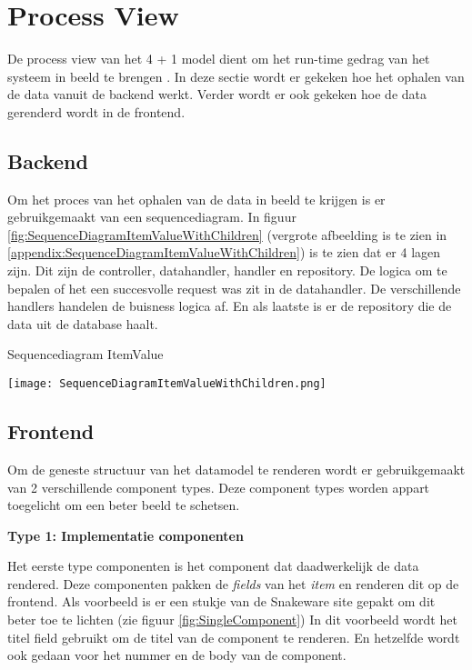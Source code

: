 \section{Process View}
De process view van het 4 + 1 model dient om het run-time gedrag van het systeem in beeld te brengen \parencite{4p1Model}.
In deze sectie wordt er gekeken hoe het ophalen van de data vanuit de backend werkt.
Verder wordt er ook gekeken hoe de data gerenderd wordt in de frontend.

\subsection{Backend}
Om het proces van het ophalen van de data in beeld te krijgen is er gebruikgemaakt van een sequencediagram.
In figuur \ref{fig:SequenceDiagramItemValueWithChildren} (vergrote afbeelding is te zien in \ref{appendix:SequenceDiagramItemValueWithChildren}) is te zien dat er 4 lagen zijn. 
Dit zijn de controller, datahandler, handler en repository.
De logica om te bepalen of het een succesvolle request was zit in de datahandler.
De verschillende handlers handelen de buisness logica af.
En als laatste is er de repository die de data uit de database haalt.

\whitespace
\begin{graphic}
    \captionsetup{type=figure}
    \caption{Sequencediagram ItemValue}
    \texttt{[image: SequenceDiagramItemValueWithChildren.png]}
    \label{fig:SequenceDiagramItemValueWithChildren}
\end{graphic}

\newpage
\subsection{Frontend}
\label{sec:FrontendProcessView}
Om de geneste structuur van het datamodel te renderen wordt er gebruikgemaakt van 2 verschillende component types.
Deze component types worden appart toegelicht om een beter beeld te schetsen.

\whitespace[2]
\textbf{Type 1: Implementatie componenten}

\whitespace
Het eerste type componenten is het component dat daadwerkelijk de data rendered.
Deze componenten pakken de \textit{fields} van het \textit{item} en renderen dit op de frontend.
Als voorbeeld is er een stukje van de Snakeware site gepakt om dit beter toe te lichten (zie figuur \ref{fig:SingleComponent})
In dit voorbeeld wordt het titel field  gebruikt om de titel van de component te renderen.
En hetzelfde wordt ook gedaan voor het nummer en de body van de component.

